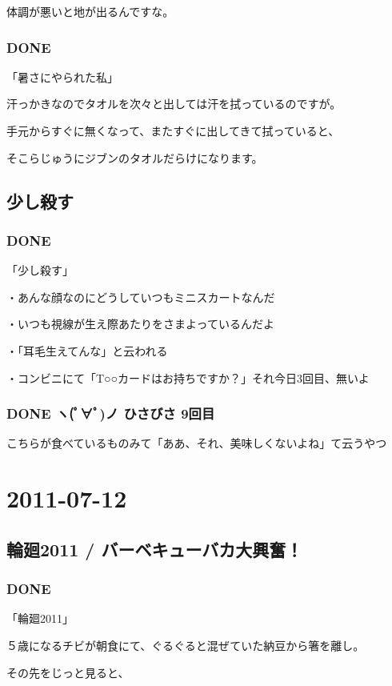 \documentclass[11pt]{article}
\begin{document}
体調が悪いと地が出るんですな。
\subsubsection{\textbf{DONE}}
\label{sec-95_1_6}

「暑さにやられた私」

汗っかきなのでタオルを次々と出しては汗を拭っているのですが。

手元からすぐに無くなって、またすぐに出してきて拭っていると、

そこらじゅうにジブンのタオルだらけになります。
\subsection{少し殺す}
\label{sec-95_2}
\subsubsection{\textbf{DONE}}
\label{sec-95_2_1}

「少し殺す」

・あんな顔なのにどうしていつもミニスカートなんだ

・いつも視線が生え際あたりをさまよっているんだよ

・「耳毛生えてんな」と云われる

・コンビニにて「T○○カードはお持ちですか？」それ今日3回目、無いよ
\subsubsection{\textbf{DONE} ヽ(ﾟ∀ﾟ)ノ ひさびさ 9回目}
\label{sec-95_2_2}


こちらが食べているものみて「ああ、それ、美味しくないよね」て云うやつ
\section{2011-07-12}
\label{sec-96}
\subsection{輪廻2011 / バーベキューバカ大興奮！}
\label{sec-96_1}
\subsubsection{\textbf{DONE}}
\label{sec-96_1_1}

「輪廻2011」

５歳になるチビが朝食にて、ぐるぐると混ぜていた納豆から箸を離し。

その先をじっと見ると、
\end{document}
